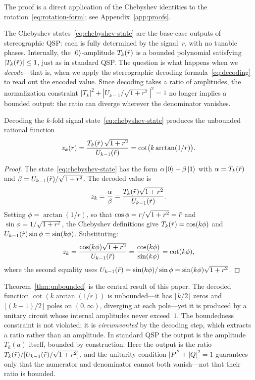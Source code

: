 The proof is a direct application of the Chebyshev identities
to the rotation~\eqref{eq:rotation-form}; see
Appendix~\ref{app:proofs}.

The Chebyshev states~\eqref{eq:chebyshev-state} are the
base-case outputs of stereographic QSP: each is fully
determined by the signal~$r$, with no tunable phases.
Internally, the $\ket{0}$-amplitude $T_k(\tilde{r})$ is a
bounded polynomial satisfying $|T_k(\tilde{r})| \leq 1$, just
as in standard QSP.  The question is what happens when we
\emph{decode}---that is, when we apply the stereographic
decoding formula~\eqref{eq:decoding} to read out the encoded value.
Since decoding takes a ratio of amplitudes, the normalization
constraint $|T_k|^2 + |U_{k-1}/\sqrt{1+r^2}|^2 = 1$ no
longer implies a bounded output: the ratio can diverge wherever
the denominator vanishes.

\begin{theorem}
	\label{thm:unbounded}
	Decoding the $k$-fold signal state~\eqref{eq:chebyshev-state} produces the unbounded rational function
	\begin{equation}
		z_k(r) = \frac{T_k(\tilde{r})\,\sqrt{1+r^2}}{U_{k-1}(\tilde{r})} = \cot\!\big(k\arctan(1/r)\big).
		\label{eq:cot-identity}
	\end{equation}
\end{theorem}

\begin{proof}
	The state~\eqref{eq:chebyshev-state} has the form $\alpha\ket{0} + \beta\ket{1}$ with $\alpha = T_k(\tilde{r})$ and $\beta = U_{k-1}(\tilde{r})/\sqrt{1+r^2}$. The decoded value is
	\begin{equation}
		z_k = \frac{\alpha}{\beta} = \frac{T_k(\tilde{r})\sqrt{1+r^2}}{U_{k-1}(\tilde{r})}.
	\end{equation}
	Setting $\phi = \arctan(1/r)$, so that $\cos\phi = r/\sqrt{1+r^2} = \tilde{r}$ and $\sin\phi = 1/\sqrt{1+r^2}$, the Chebyshev definitions give $T_k(\tilde{r}) = \cos(k\phi)$ and $U_{k-1}(\tilde{r})\sin\phi = \sin(k\phi)$. Substituting:
	\begin{equation}
		z_k = \frac{\cos(k\phi)\sqrt{1+r^2}}{U_{k-1}(\tilde{r})} = \frac{\cos(k\phi)}{\sin(k\phi)} = \cot(k\phi),
	\end{equation}
	where the second equality uses $U_{k-1}(\tilde{r}) = \sin(k\phi)/\sin\phi = \sin(k\phi)\sqrt{1+r^2}$.
\end{proof}

Theorem~\ref{thm:unbounded} is the central result of this
paper.  The decoded function $\cot(k\arctan(1/r))$ is
unbounded---it has $\lfloor k/2 \rfloor$ zeros and
$\lfloor(k{-}1)/2\rfloor$ poles on $(0,\infty)$, diverging at
each pole---yet it is produced by a unitary circuit whose
internal amplitudes never exceed~$1$.  The boundedness
constraint is not violated; it is \emph{circumvented} by the
decoding step, which extracts a ratio rather than an amplitude.
In standard QSP the output is the amplitude $T_k(a)$ itself,
bounded by construction.  Here the output is the ratio
$T_k(\tilde{r})/[U_{k-1}(\tilde{r})/\sqrt{1+r^2}]$, and the
unitarity condition $|P|^2+|Q|^2=1$ guarantees only that the
numerator and denominator cannot both vanish---not that their
ratio is bounded.

